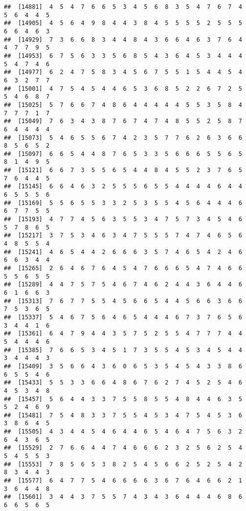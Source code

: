 \documentclass[
]{book}
\begin{document}
\begin{verbatim}
##  [14881]  4  5  4  7  6  6  5  3  4  5  6  8  3  5  4  7  6  7  4  5  6  4  4  5
##  [14905]  4  5  6  4  9  8  4  4  3  8  4  5  5  5  5  2  5  5  5  6  6  4  6  3
##  [14929]  7  3  6  6  8  3  4  4  8  4  3  6  6  4  6  3  7  6  4  4  7  7  9  5
##  [14953]  6  7  5  6  3  3  5  6  8  5  4  3  6  4  5  3  4  4  4  5  4  7  4  6
##  [14977]  6  2  4  7  5  8  3  4  5  6  7  5  5  1  5  4  4  5  4  6  3  2  7  7
##  [15001]  4  7  5  4  5  4  4  6  5  3  6  8  5  2  2  6  7  2  5  5  4  6  8  7
##  [15025]  5  7  6  6  7  4  8  6  4  4  4  4  4  5  5  3  5  8  4  7  7  7  1  7
##  [15049]  7  6  3  4  3  8  7  6  7  4  7  4  8  5  5  2  5  8  7  6  4  4  4  4
##  [15073]  5  4  6  5  5  6  7  4  2  3  5  7  7  6  2  6  3  6  6  8  5  6  5  2
##  [15097]  6  6  5  4  4  8  7  6  5  3  3  5  6  6  6  5  5  6  5  8  1  4  9  5
##  [15121]  6  6  7  3  5  5  6  5  4  4  8  4  5  5  2  3  7  6  5  7  6  4  4  5
##  [15145]  6  6  4  6  3  2  5  5  5  6  5  5  4  4  4  4  6  4  4  6  5  5  5  6
##  [15169]  5  5  6  5  5  3  3  2  5  3  5  5  4  5  6  4  4  4  6  6  7  7  5  5
##  [15193]  4  7  7  4  5  6  3  5  5  3  4  7  5  7  3  4  5  4  6  5  7  8  6  5
##  [15217]  3  7  5  3  4  6  3  4  7  5  5  5  7  4  7  4  6  5  6  4  8  5  5  4
##  [15241]  4  6  5  4  4  2  6  6  6  3  5  7  4  6  5  4  2  4  6  6  6  3  4  4
##  [15265]  2  6  4  6  7  6  4  5  4  7  6  6  6  5  4  7  4  6  6  5  5  6  5  5
##  [15289]  4  4  7  5  7  5  4  6  7  4  6  2  4  4  3  6  4  4  6  6  1  6  6  3
##  [15313]  7  6  7  7  5  5  4  5  6  6  5  4  4  5  6  6  3  6  6  7  5  3  6  5
##  [15337]  5  4  6  7  5  6  4  6  5  4  4  4  6  7  3  7  6  5  6  3  4  4  1  6
##  [15361]  6  4  7  9  4  4  3  5  7  5  2  5  5  4  7  7  7  4  4  5  4  4  4  6
##  [15385]  7  6  6  5  3  4  5  1  7  3  5  5  4  5  3  4  5  4  4  3  4  4  4  3
##  [15409]  3  5  6  6  4  3  6  0  6  5  3  5  4  5  4  3  3  8  6  6  5  5  4  6
##  [15433]  5  5  3  3  6  6  4  8  6  7  6  2  7  4  5  2  5  4  6  4  5  3  4  8
##  [15457]  5  6  4  4  3  3  7  5  5  8  5  5  4  8  4  4  6  3  5  5  2  4  6  9
##  [15481]  7  5  4  8  3  3  7  5  5  4  5  3  4  7  5  4  5  3  6  3  8  6  4  5
##  [15505]  4  3  4  4  5  4  6  4  4  6  5  4  6  4  7  5  6  3  2  6  4  3  6  5
##  [15529]  2  7  6  6  4  4  7  4  6  6  6  2  3  2  5  6  2  5  4  5  4  5  5  3
##  [15553]  7  8  5  6  5  3  8  2  5  4  5  6  6  2  5  2  5  4  2  8  3  4  4  3
##  [15577]  6  4  7  7  5  4  6  6  6  6  3  6  7  6  4  6  6  2  1  3  6  4  4  8
##  [15601]  3  4  4  3  7  5  5  7  4  3  4  3  6  4  4  4  6  8  6  6  6  5  6  5

\end{verbatim}
\end{document}
